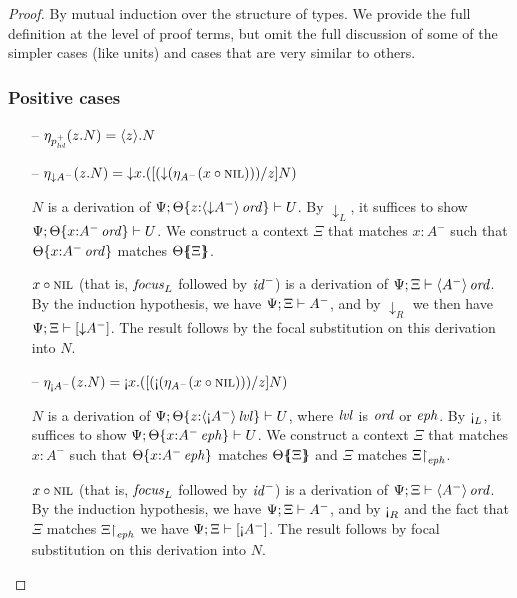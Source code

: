 \begin{proof} By mutual induction over the structure of types. We 
provide the full definition at the level of proof terms, but omit
the full discussion of some of the simpler cases (like units) and
cases that are very similar to others.

\subsubsection{Positive cases}

\begin{itemize}
\item[--] $\etapa{z}{N}{p^+_\mlvl} = \tetap{z}{N}$
\item[--] $\etapa{z}{N}{{\downarrow}A^-} 
           = \tdownl{x}{([(\tdownr{(\etana{\tfocusl{x}{\tnil}}{A^-})})/z]N)}$
  \smallskip

  $N$ is a derivation of 
  $\foc{\Psi}{\tackon{\Theta}{z{:}\istrue{\susp{{\downarrow}A^-}}}}{U}$.
  By ${\downarrow_L}$, it suffices to show 
  $\foc{\Psi}{\tackon{\Theta}{x{:}\istrue{A^-}}}{U}$.
  We construct a context $\Xi$ that matches $x{:}A^-$ such that
  $\tackon{\Theta}{x{:}\istrue{A^-}}$ matches $\frameoff{\Theta}{\Xi}$.
  \smallskip

  $\tfocusl{x}{\tnil}$ (that is, ${\it focus}_L$ followed by ${\it id}^-$) 
  is a derivation of 
  $\foc{\Psi}{\Xi}{\istrue{\susp{A^-}}}$.
  By the induction hypothesis, we have 
  $\foc{\Psi}{\Xi}{A^-}$, and by ${\downarrow}_R$
  we then have 
  $\foc{\Psi}{\Xi}{[ {\downarrow}{A^-} ]}$. 
  The result follows by the focal substitution on this derivation into $N$.
  \smallskip

\item[--] $\etapa{z}{N}{{\scriptgnab}A^-}
           = \tgnabl{x}{([(\tgnabr{(\etana{\tfocusl{x}{\tnil}}{A^-})})/z]N)}$ 
  \smallskip

  $N$ is a derivation of 
  $\foc{\Psi}{\tackon{\Theta}{z{:}\islvl{\susp{{\gnab}A^-}}}}{U}$, where
  $\mlvl$ is $\mtrue$ or $\meph$.
  By ${\gnab}_L$, it suffices to show 
  $\foc{\Psi}{\tackon{\Theta}{x{:}\iseph{A^-}}}{U}$.
  We construct a context $\Xi$ that matches $x{:}A^-$ such that
  $\tackon{\Theta}{x{:}\iseph{A^-}}$ matches $\frameoff{\Theta}{\Xi}$
  and $\Xi$ matches $\restrictto{\Xi}{\meph}$.
  \smallskip

  $\tfocusl{x}{\tnil}$ (that is, ${\it focus}_L$ followed by
  ${\it id}^-$) is a derivation of $\foc{\Psi}{\Xi}{\istrue{\susp{A^-}}}$. 
  By the induction hypothesis, we have $\foc{\Psi}{\Xi}{A^-}$, 
  and by ${\gnab}_R$ and the fact that $\Xi$ matches $\restrictto{\Xi}{\meph}$
  we have $\foc{\Psi}{\Xi}{[{\gnab}A^-]}$. The result follows
  by focal substitution on this derivation into $N$.
  \smallskip


\end{itemize}
\end{proof}
